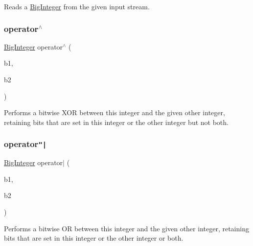 Reads a \mbox{\hyperlink{classBigInteger}{Big\+Integer}} from the given input stream. 

\mbox{\label{classBigInteger_a7a93a422d668c89ff99135bff3f3d6eb}} 
\subsubsection{\texorpdfstring{operator$^\wedge$}{operator^}}
{\footnotesize\ttfamily \mbox{\hyperlink{classBigInteger}{Big\+Integer}} operator$^\wedge$ (\begin{DoxyParamCaption}\item[{const \mbox{\hyperlink{classBigInteger}{Big\+Integer}} \&}]{b1,  }\item[{const \mbox{\hyperlink{classBigInteger}{Big\+Integer}} \&}]{b2 }\end{DoxyParamCaption})\hspace{0.3cm}{\ttfamily [friend]}}



Performs a bitwise X\+OR between this integer and the given other integer, retaining bits that are set in this integer or the other integer but not both. 

\mbox{\label{classBigInteger_ac175a35da208aba1aaddbfc60742f294}} 
\subsubsection{\texorpdfstring{operator\texttt{"|}}{operator|}}
{\footnotesize\ttfamily \mbox{\hyperlink{classBigInteger}{Big\+Integer}} operator$\vert$ (\begin{DoxyParamCaption}\item[{const \mbox{\hyperlink{classBigInteger}{Big\+Integer}} \&}]{b1,  }\item[{const \mbox{\hyperlink{classBigInteger}{Big\+Integer}} \&}]{b2 }\end{DoxyParamCaption})\hspace{0.3cm}{\ttfamily [friend]}}



Performs a bitwise OR between this integer and the given other integer, retaining bits that are set in this integer or the other integer or both. 




